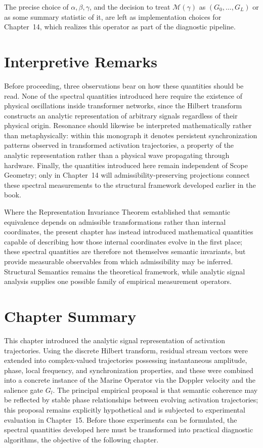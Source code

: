 \documentclass[11pt,twoside,openright]{book}
\numberwithin{equation}{chapter}
\theoremstyle{definition}
\theoremstyle{plain}
\theoremstyle{remark}
\theoremstyle{definition}
\begin{document}
The precise choice of $\alpha,\beta,\gamma$, and the decision to treat
$\mathcal{M}(\gamma)$ as $(G_0,\ldots,G_L)$ or as some summary statistic
of it, are left as implementation choices for Chapter~14, which realizes
this operator as part of the diagnostic pipeline.

\section{Interpretive Remarks}

Before proceeding, three observations bear on how these quantities
should be read. None of the spectral quantities introduced here require
the existence of physical oscillations inside transformer networks,
since the Hilbert transform constructs an analytic representation of
arbitrary signals regardless of their physical origin. Resonance should
likewise be interpreted mathematically rather than metaphysically:
within this monograph it denotes persistent synchronization patterns
observed in transformed activation trajectories, a property of the
analytic representation rather than a physical wave propagating through
hardware. Finally, the quantities introduced here remain independent of
Scope Geometry; only in Chapter~14 will admissibility-preserving
projections connect these spectral measurements to the structural
framework developed earlier in the book.

Where the Representation Invariance Theorem established that semantic
equivalence depends on admissible transformations rather than internal
coordinates, the present chapter has instead introduced mathematical
quantities capable of describing how those internal coordinates evolve
in the first place; these spectral quantities are therefore not
themselves semantic invariants, but provide measurable observables from
which admissibility may be inferred. Structural Semantics remains the
theoretical framework, while analytic signal analysis supplies one
possible family of empirical measurement operators.

\section{Chapter Summary}

This chapter introduced the analytic signal representation of activation
trajectories. Using the discrete Hilbert transform, residual stream
vectors were extended into complex-valued trajectories possessing
instantaneous amplitude, phase, local frequency, and synchronization
properties, and these were combined into a concrete instance of the
Marine Operator via the Doppler velocity and the salience gate $G_l$. The
principal empirical proposal is that semantic coherence may be reflected
by stable phase relationships between evolving activation trajectories;
this proposal remains explicitly hypothetical and is subjected to
experimental evaluation in Chapter~15. Before those experiments can be
formulated, the spectral quantities developed here must be transformed
into practical diagnostic algorithms, the objective of the following
chapter.
\end{document}
